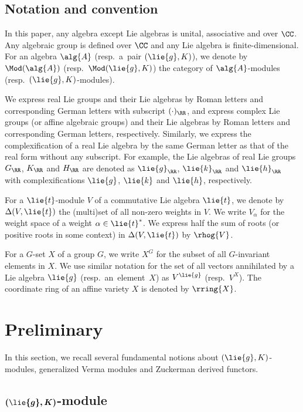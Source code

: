 \subsection*{Notation and convention}

In this paper, any algebra except Lie algebras is unital, associative and over $\CC$.
Any algebraic group is defined over $\CC$ and any Lie algebra is finite-dimensional.
For an algebra $\alg{A}$ (resp.\ a~pair $(\lie{g}, K)$), we denote by $\Mod(\alg{A})$ (resp.\ $\Mod(\lie{g}, K)$) the category of $\alg{A}$-modules (resp.\ \mbox{$(\lie{g}, K)$-modules}).

We express real Lie groups and their Lie algebras by Roman letters and corresponding German letters with subscript $(\cdot)_\RR$, and express complex Lie groups (or affine algebraic groups) and their Lie algebras by Roman letters and corresponding German letters, respectively.
Similarly, we express the complexification of a real Lie algebra by the same German letter as that of the real form without any subscript.
For example, the Lie algebras of real Lie groups $G_\RR$, $K_\RR$ and $H_\RR$ are denoted as $\lie{g}_\RR$, $\lie{k}_\RR$ and $\lie{h}_\RR$ with complexifications $\lie{g}$, $\lie{k}$ and $\lie{h}$, respectively.

For a $\lie{t}$-module $V$ of a commutative Lie algebra $\lie{t}$, we denote by $\Delta(V, \lie{t})$ the (multi)set of all non-zero weights in $V$.
We write $V_\alpha$ for the weight space of a weight $\alpha \in \lie{t}^*$.
We express half the sum of roots (or positive roots in some context) in $\Delta(V, \lie{t})$ by $\rhog{V}$.

For a $G$-set $X$ of a group $G$, we write $X^G$ for the subset of all $G$-invariant elements in $X$.
We use similar notation for the set of all vectors annihilated by a Lie algebra $\lie{g}$ (resp.\ an~element~$X$) as $V^{\lie{g}}$ \big(resp.\ $V^X$\big).
The coordinate ring of an affine variety $X$ is denoted by $\rring{X}$.


\section{Preliminary}

In this section, we recall several fundamental notions about $(\lie{g}, K)$-modules, generalized Verma modules and Zuckerman derived functors.

\subsection[(g,K)-module]{$\boldsymbol{(\lie{g}, K)}$-module}\label{subsect:GKmod}

